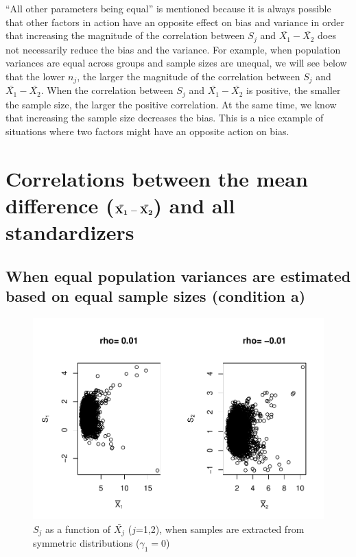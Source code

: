 \documentclass[
  english,
  man,mask]{apa6}
\begin{document}
``All other parameters being equal'' is mentioned because it is always possible that other factors in action have an opposite effect on bias and variance in order that increasing the magnitude of the correlation between \(S_j\) and \(\bar{X_1}-\bar{X_2}\) does not necessarily reduce the bias and the variance. For example, when population variances are equal across groups and sample sizes are unequal, we will see below that the lower \(n_j\), the larger the magnitude of the correlation between \(S_j\) and \(\bar{X_1}-\bar{X_2}\). When the correlation between \(S_j\) and \(\bar{X_1}-\bar{X_2}\) is positive, the smaller the sample size, the larger the positive correlation. At the same time, we know that increasing the sample size decreases the bias. This is a nice example of situations where two factors might have an opposite action on bias.

\hypertarget{correlations-between-the-mean-difference-bf-barx_1-barx_2-and-all-standardizers}{%
\section{\texorpdfstring{Correlations between the mean difference (\(\bf \bar{X_1}-\bar{X_2}\)) and all standardizers}{Correlations between the mean difference (\textbackslash bf \textbackslash bar\{X\_1\}-\textbackslash bar\{X\_2\}) and all standardizers}}\label{correlations-between-the-mean-difference-bf-barx_1-barx_2-and-all-standardizers}}

\hypertarget{when-equal-population-variances-are-estimated-based-on-equal-sample-sizes-condition-a}{%
\subsection{When equal population variances are estimated based on equal sample sizes (condition a)}\label{when-equal-population-variances-are-estimated-based-on-equal-sample-sizes-condition-a}}

\begin{figure}
\centering
\includegraphics{Correlation_files/figure-latex/pltSDMEANHombalsym-1.pdf}
\caption{\label{fig:pltSDMEANHombalsym}\(S_j\) as a function of \(\bar{X_j}\) (\(j\)=1,2), when samples are extracted from symmetric distributions (\(\gamma_1 = 0\))}
\end{figure}
\end{document}
